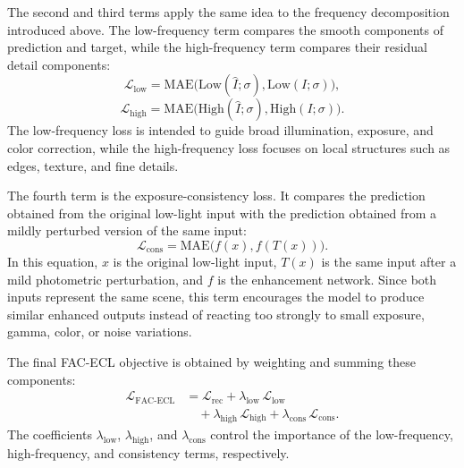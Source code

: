 The second and third terms apply the same idea to the frequency decomposition introduced above. The low-frequency term compares the smooth components of prediction and target, while the high-frequency term compares their residual detail components:
\begin{equation}
	\mathcal{L}_{\mathrm{low}}
	=
	\mathrm{MAE}
	\bigl(
	\mathrm{Low}(\hat{I};\sigma),
	\mathrm{Low}(I;\sigma)
	\bigr),
	\label{eq:fac_ecl_low_loss}
\end{equation}
\begin{equation}
	\mathcal{L}_{\mathrm{high}}
	=
	\mathrm{MAE}
	\bigl(
	\mathrm{High}(\hat{I};\sigma),
	\mathrm{High}(I;\sigma)
	\bigr).
	\label{eq:fac_ecl_high_loss}
\end{equation}
The low-frequency loss is intended to guide broad illumination, exposure, and color correction, while the high-frequency loss focuses on local structures such as edges, texture, and fine details.

The fourth term is the exposure-consistency loss. It compares the prediction obtained from the original low-light input with the prediction obtained from a mildly perturbed version of the same input:
\begin{equation}
	\mathcal{L}_{\mathrm{cons}}
	=
	\mathrm{MAE}
	\bigl(
	f(x),
	f(T(x))
	\bigr).
	\label{eq:fac_ecl_cons_loss}
\end{equation}
In this equation, $x$ is the original low-light input, $T(x)$ is the same input after a mild photometric perturbation, and $f$ is the enhancement network. Since both inputs represent the same scene, this term encourages the model to produce similar enhanced outputs instead of reacting too strongly to small exposure, gamma, color, or noise variations.

The final FAC-ECL objective is obtained by weighting and summing these components:
\begin{equation}
	\begin{aligned}
		\mathcal{L}_{\mathrm{FAC\text{-}ECL}}
		&=
		\mathcal{L}_{\mathrm{rec}}
		+
		\lambda_{\mathrm{low}}\,\mathcal{L}_{\mathrm{low}} \\
		&\quad+
		\lambda_{\mathrm{high}}\,\mathcal{L}_{\mathrm{high}}
		+
		\lambda_{\mathrm{cons}}\,\mathcal{L}_{\mathrm{cons}}.
	\end{aligned}
	\label{eq:fac_ecl_loss}
\end{equation}
The coefficients $\lambda_{\mathrm{low}}$, $\lambda_{\mathrm{high}}$, and $\lambda_{\mathrm{cons}}$ control the importance of the low-frequency, high-frequency, and consistency terms, respectively.

